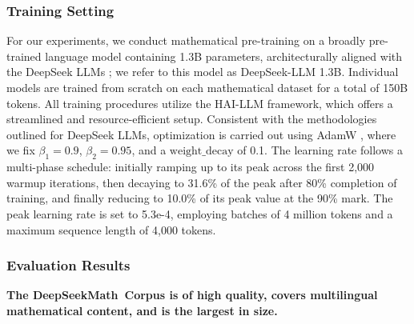 \begin{itemize}[topsep=0pt]
\subsubsection{Training Setting}
\label{sec:quality-policy}
For our experiments, we conduct mathematical pre-training on a broadly pre-trained language model containing 1.3B parameters, architecturally aligned with the DeepSeek LLMs \citep{deepseek-llm}; we refer to this model as DeepSeek-LLM 1.3B. Individual models are trained from scratch on each mathematical dataset for a total of 150B tokens. All training procedures utilize the HAI-LLM \citep{haillm} framework, which offers a streamlined and resource-efficient setup. Consistent with the methodologies outlined for DeepSeek LLMs, optimization is carried out using AdamW \citep{adamW}, where we fix $\beta_1=0.9$, $\beta_2=0.95$, and a $\mathrm{weight\_decay}$ of 0.1. The learning rate follows a multi-phase schedule: initially ramping up to its peak across the first 2,000 warmup iterations, then decaying to 31.6\% of the peak after 80\% completion of training, and finally reducing to 10.0\% of its peak value at the 90\% mark. The peak learning rate is set to 5.3e-4, employing batches of 4 million tokens and a maximum sequence length of 4,000 tokens.

\subsubsection{Evaluation Results}

\textbf{The DeepSeekMath~Corpus is of high quality, covers multilingual mathematical content, and is the largest in size.}


\end{itemize}
